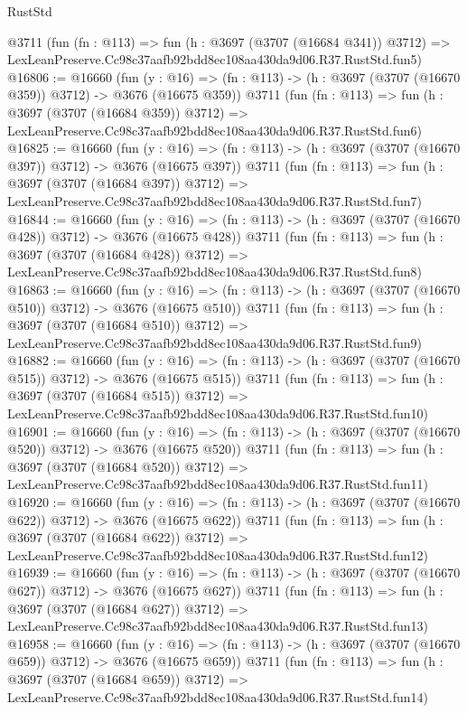 \begin{lexlean}{RustStd}
\begin{coremodule}
    @3711
    (fun (fn : @113) =>
    fun (h : @3697 (@3707 (@16684 @341)) @3712) =>
    LexLeanPreserve.Cc98c37aafb92bdd8ec108aa430da9d06.R37.RustStd.fun5)
@16806 := @16660
    (fun (y : @16) => (fn : @113) -> (h : @3697 (@3707 (@16670 @359)) @3712) -> @3676 (@16675 @359))
    @3711
    (fun (fn : @113) =>
    fun (h : @3697 (@3707 (@16684 @359)) @3712) =>
    LexLeanPreserve.Cc98c37aafb92bdd8ec108aa430da9d06.R37.RustStd.fun6)
@16825 := @16660
    (fun (y : @16) => (fn : @113) -> (h : @3697 (@3707 (@16670 @397)) @3712) -> @3676 (@16675 @397))
    @3711
    (fun (fn : @113) =>
    fun (h : @3697 (@3707 (@16684 @397)) @3712) =>
    LexLeanPreserve.Cc98c37aafb92bdd8ec108aa430da9d06.R37.RustStd.fun7)
@16844 := @16660
    (fun (y : @16) => (fn : @113) -> (h : @3697 (@3707 (@16670 @428)) @3712) -> @3676 (@16675 @428))
    @3711
    (fun (fn : @113) =>
    fun (h : @3697 (@3707 (@16684 @428)) @3712) =>
    LexLeanPreserve.Cc98c37aafb92bdd8ec108aa430da9d06.R37.RustStd.fun8)
@16863 := @16660
    (fun (y : @16) => (fn : @113) -> (h : @3697 (@3707 (@16670 @510)) @3712) -> @3676 (@16675 @510))
    @3711
    (fun (fn : @113) =>
    fun (h : @3697 (@3707 (@16684 @510)) @3712) =>
    LexLeanPreserve.Cc98c37aafb92bdd8ec108aa430da9d06.R37.RustStd.fun9)
@16882 := @16660
    (fun (y : @16) => (fn : @113) -> (h : @3697 (@3707 (@16670 @515)) @3712) -> @3676 (@16675 @515))
    @3711
    (fun (fn : @113) =>
    fun (h : @3697 (@3707 (@16684 @515)) @3712) =>
    LexLeanPreserve.Cc98c37aafb92bdd8ec108aa430da9d06.R37.RustStd.fun10)
@16901 := @16660
    (fun (y : @16) => (fn : @113) -> (h : @3697 (@3707 (@16670 @520)) @3712) -> @3676 (@16675 @520))
    @3711
    (fun (fn : @113) =>
    fun (h : @3697 (@3707 (@16684 @520)) @3712) =>
    LexLeanPreserve.Cc98c37aafb92bdd8ec108aa430da9d06.R37.RustStd.fun11)
@16920 := @16660
    (fun (y : @16) => (fn : @113) -> (h : @3697 (@3707 (@16670 @622)) @3712) -> @3676 (@16675 @622))
    @3711
    (fun (fn : @113) =>
    fun (h : @3697 (@3707 (@16684 @622)) @3712) =>
    LexLeanPreserve.Cc98c37aafb92bdd8ec108aa430da9d06.R37.RustStd.fun12)
@16939 := @16660
    (fun (y : @16) => (fn : @113) -> (h : @3697 (@3707 (@16670 @627)) @3712) -> @3676 (@16675 @627))
    @3711
    (fun (fn : @113) =>
    fun (h : @3697 (@3707 (@16684 @627)) @3712) =>
    LexLeanPreserve.Cc98c37aafb92bdd8ec108aa430da9d06.R37.RustStd.fun13)
@16958 := @16660
    (fun (y : @16) => (fn : @113) -> (h : @3697 (@3707 (@16670 @659)) @3712) -> @3676 (@16675 @659))
    @3711
    (fun (fn : @113) =>
    fun (h : @3697 (@3707 (@16684 @659)) @3712) =>
    LexLeanPreserve.Cc98c37aafb92bdd8ec108aa430da9d06.R37.RustStd.fun14)

\end{coremodule}
\end{lexlean}
